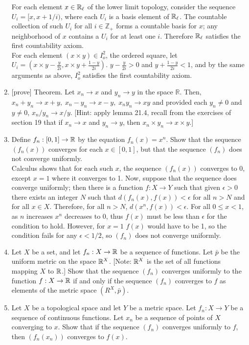 \documentclass[12pt,letterpaper]{article}
\begin{document}
\begin{enumerate}
  For each element $x\in\mathbb{R}_\ell$ of the lower limit topology, consider the sequence $U_i=[x,x+1/i)$, where each $U_i$ is a basis element of $\mathbb{R}_\ell$. The countable collection of such $U_i$ for all $i\in\mathbb{Z}_+$ forms a countable basis for $x$; any neighborhood of $x$ contains a $U_i$ for at least one $i$. Therefore $\mathbb{R}_\ell$ satisfies the first countability axiom. \\
  For each element $(x\times y)\in I_o^2$, the ordered square, let $U_i=(x \times y - \frac{y}{2i}, x\times y + \frac{1-y}{2i})$. $y-\frac{y}{2i}>0$ and $y+\frac{1-y}{2i} < 1$, and by the same arguments as above, $I_o^2$ satisfies the first countability axiom.
  \item{} [prove] Theorem. Let $x_n\rightarrow x$ and $y_n \rightarrow y$ in the space $\mathbb{R}$. Then, $x_n+y_n \rightarrow x+y,\; x_n-y_n\rightarrow x-y,\; x_ny_n\rightarrow xy$ and provided each $y_n\neq 0$ and $y\neq 0$, $x_n/y_n\rightarrow x/y$. [Hint: apply lemma 21.4, recall from the exercises of section 19 that if $x_n\rightarrow x$ and $y_n\rightarrow y$, then $x_n\times y_n \rightarrow x\times y.$]
  \item Define $f_n : [0,1]\rightarrow \mathbb{R}$ by the equation $f_n(x)=x^n$. Show that the sequence $(f_n(x))$ converges for each $x\in [0,1]$, but that the sequence $(f_n)$ does not converge uniformly. \\
  Calculus shows that for each such $x$, the sequence $(f_n(x))$ converges to 0, except $x=1$ where it converges to 1. Now, suppose that the sequence does converge uniformly; then there is a function $f:X\rightarrow Y$ such that given $\epsilon>0$ there exists an integer $N$ such that $d(f_n(x),f(x))<\epsilon$ for all $n>N$ and for all $x\in X$. Therefore, for all $n>N$, $d(x^n,f(x))<\epsilon$. For all $0\leq x<1$, as $n$ increases $x^n$ decreases to $0$, thus $f(x)$ must be less than $\epsilon$ for the condition to hold. However, for $x=1$ $f(x)$ would have to be 1, so the condition fails for any $\epsilon < 1/2$, so $(f_n)$ does not converge uniformly.
  \item Let $X$ be a set, and let $f_n:X\rightarrow \mathbb{R}$ be a sequence of functions. Let $\bar{p}$ be the uniform metric on the space $\mathbb{R}^X$. [Note: $\mathbb{R}^X$ is the set of all functions mapping $X$ to $\mathbb{R}$.] Show that the sequence $(f_n)$ converges uniformly to the function $f: X\rightarrow \mathbb{R}$ if and only if the sequence $(f_n)$ converges to $f$ as elements of the metric space $(R^X,\bar{p})$.
  \item Let $X$ be a topological space and let $Y$ be a metric space. Let $f_n: X\rightarrow Y$ be a sequence of continuous functions. Let $x_n$ be a sequence of points of $X$ converging to $x$. Show that if the sequence $(f_n)$ converges uniformly to $f$, then $(f_n(x_n))$ converges to $f(x)$. \\

\end{enumerate}
\end{document}
